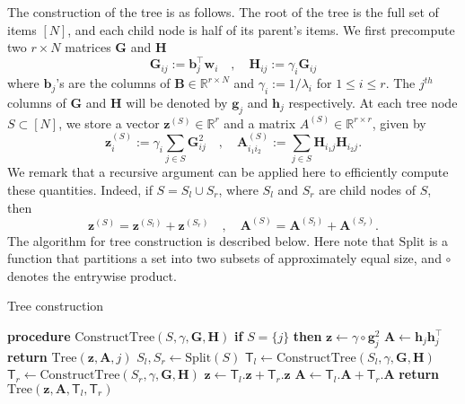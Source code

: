 {
The construction of the tree is as follows. The root of the tree is the full set of items $[N]$, and each child node is half of its parent's items. We first precompute two $r\times N$ matrices $\mathbf{G}$ and $\mathbf{H}$ 
\[ \mathbf{G}_{ij} := \mathbf{b}_j^\top \mathbf{w}_i \quad,\quad \mathbf{H}_{ij} := \gamma_i \mathbf{G}_{ij}\]
where $\mathbf{b}_j$'s are the columns of $\mathbf{B}\in\mathbb{R}^{r\times N}$ and $\gamma_i:=1/\lambda_i$ for $1\le i \le r$.
The $j^{th}$ columns of $\mathbf{G}$ and $\mathbf{H}$ will be denoted by $\mathbf{g}_j$ and $\mathbf{h}_j$ respectively.
At each tree node $S \subset [N]$, we store a vector $\mathbf{z}^{(S)}\in\mathbb R^r$ and a matrix $A^{(S)}\in \mathbb{R}^{r\times r}$, given by
\[\mathbf{z}^{(S)}_i := \gamma_i \sum_{j\in S} \mathbf{G}_{ij}^2 \quad,\quad \mathbf{A}^{(S)}_{i_1 i_2} := \sum_{j\in S} \mathbf{H}_{i_1 j} \mathbf{H}_{i_2 j}.\]
We remark that a recursive argument can be applied here to efficiently compute these quantities. Indeed, if $S=S_l \cup S_r$, where $S_l$ and $S_r$ are child nodes of $S$, then 
\[\mathbf{z}^{(S)} = \mathbf{z}^{(S_l)} + \mathbf{z}^{(S_r)}\quad,\quad \mathbf{A}^{(S)} = \mathbf{A}^{(S_l)} + \mathbf{A}^{(S_r)}.\]
The algorithm for tree construction is described below. Here note that $\mathrm{Split}$ is a function that partitions a set into two subsets of approximately equal size, and $\circ$ denotes the entrywise product.}
\begin{algorithm} [H] \label{alg:tree-const}
\caption{Tree construction}
\begin{algorithmic}[1]
    \State \textbf{procedure} $\mathrm{ConstructTree}(S,\gamma,\mathbf{G},\mathbf{H})$
    \State \quad \textbf{if} $S=\{j\}$ \textbf{then}
    \State \quad \quad $\mathbf{z} \leftarrow \gamma \circ \mathbf{g}_j^2$
    \State \quad \quad $\mathbf{A} \leftarrow \mathbf{h}_j \mathbf{h}_j^\top$
    \State \quad \quad \textbf{return} $\mathrm{Tree}(\mathbf{z},\mathbf{A},j)$
    \State \quad $S_l, S_r \leftarrow \mathrm{Split}(S)$ 
    \State \quad $\mathsf{T}_l \leftarrow \mathrm{ConstructTree}(S_l,\gamma,\mathbf{G},\mathbf{H})$
    \State \quad $\mathsf{T}_r \leftarrow \mathrm{ConstructTree}(S_r,\gamma,\mathbf{G},\mathbf{H})$
    \State \quad $\mathbf{z}\leftarrow \mathsf{T}_l.\mathbf{z} + \mathsf{T}_r.\mathbf{z} $
    \State \quad $\mathbf{A}\leftarrow \mathsf{T}_l.\mathbf{A} + \mathsf{T}_r.\mathbf{A} $
    \State \textbf{return} $\mathrm{Tree}(\mathbf{z}, \mathbf{A}, \mathsf{T}_l,\mathsf{T}_r)$
\end{algorithmic}
\end{algorithm}

